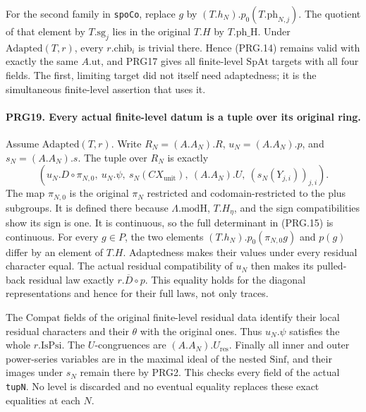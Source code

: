 For the second family in \texttt{spoCo}, replace \(g\) by
\((T.h_N).p_0(T.\mathrm{ph}_{N,j})\). The quotient of that element
by \(T.\mathrm{sg}_j\) lies in the original \(T.H\) by
\(T.\mathrm{ph\_H}\). Under \(\mathrm{Adapted}(T,r)\), every
\(r.\mathrm{chib}_i\) is trivial there. Hence (PRG.14) remains
valid with exactly the same \(A.\mathrm{ut}\), and PRG17 gives
all finite-level \(\mathrm{SpAt}\) targets with all four fields.
The first, limiting target did not itself need adaptedness; it is
the simultaneous finite-level assertion that uses it.

\paragraph{PRG19. Every actual finite-level datum is a tuple over its original ring.}
\label{claim:PRG19}
Assume \(\mathrm{Adapted}(T,r)\). Write
\(R_N=(A.A_N).R\), \(u_N=(A.A_N).p\), and
\(s_N=(A.A_N).s\). The tuple over \(R_N\) is exactly
\[
 \left(u_N.D\circ\pi_{N,0},\ u_N.\psi,\
 s_N(CX_{\mathrm{unit}}),\ (A.A_N).U,\
 (s_N(Y_{j,i}))_{j,i}\right).                             \tag{PRG.15}
\]
The map \(\pi_{N,0}\) is the original \(\pi_N\) restricted
and codomain-restricted to the plus subgroups. It is defined there
because \(\Lambda.\mathrm{modH}\), \(T.H_\eta\), and the
sign compatibilities show its sign is one. It is continuous, so
the full determinant in (PRG.15) is continuous. For every
\(g\in P\), the two elements
\((T.h_N).p_0(\pi_{N,0}g)\) and \(p(g)\) differ by an element
of \(T.H\). Adaptedness makes their values under every residual
character equal. The actual residual compatibility of \(u_N\)
then makes its pulled-back residual law exactly
\(r.\overline D\circ p\). This equality holds for the diagonal
representations and hence for their full laws, not only traces.

The \(\mathrm{Compat}\) fields of the original finite-level
residual data identify their local residual characters and their
\(\theta\) with the original ones. Thus \(u_N.\psi\) satisfies
the whole \(r.\mathrm{IsPsi}\). The \(U\)-congruences are
\((A.A_N).U_{\mathrm{res}}\). Finally all inner and outer
power-series variables are in the maximal ideal of the nested
\(\mathrm{Sinf}\), and their images under \(s_N\) remain there
by PRG2. This checks every field of the actual \texttt{tupN}.
No level is discarded and no eventual equality replaces these
exact equalities at each \(N\).

